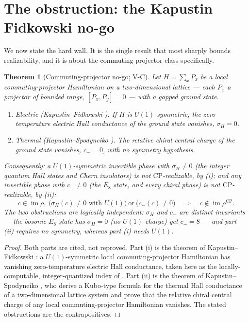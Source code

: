 \documentclass[12pt]{article}
\newcommand{\real}{\rho}                         %
\newcommand{\CP}{\mathrm{CP}}                    %
\newcommand{\im}{\operatorname{im}}
\newtheorem{theorem}{Theorem}[section]
\theoremstyle{definition}
\theoremstyle{remark}
\begin{document}
\section{The obstruction: the Kapustin--Fidkowski no-go}
\label{sec:nogo}

We now state the hard wall. It is the single result that most sharply bounds realizability,
and it is about the commuting-projector class specifically.

\begin{theorem}[Commuting-projector no-go; V-C]
\label{thm:VC}
Let $H=\sum_x P_x$ be a local commuting-projector Hamiltonian on a two-dimensional lattice
--- each $P_x$ a projector of bounded range, $[P_x,P_y]=0$ --- with a gapped ground state.
\begin{enumerate}
  \item[(i)] \emph{Electric (Kapustin--Fidkowski \cite{kapustin-fidkowski}).} If $H$ is
        $U(1)$-symmetric, the zero-temperature electric Hall conductance of the ground state
        vanishes, $\sigma_H=0$.
  \item[(ii)] \emph{Thermal (Kapustin--Spodyneiko \cite{kapustin-spodyneiko-thermal}).} The
        relative chiral central charge of the ground state vanishes, $c_-=0$, with \emph{no}
        symmetry hypothesis.
\end{enumerate}
Consequently: a $U(1)$-symmetric invertible phase with $\sigma_H\ne0$ (the integer quantum
Hall states and Chern insulators) is not $\CP$-realizable, by (i); and \emph{any} invertible
phase with $c_-\ne0$ (the $E_8$ state, and every chiral phase) is not $\CP$-realizable, by
(ii):
\[
  c\in\im\real,\ \bigl(\text{$\sigma_H(c)\ne0$ with $U(1)$}\bigr)\ \text{or}\ \bigl(c_-(c)\ne0\bigr)
  \quad\Longrightarrow\quad c\notin\im\real^{\CP}.
\]
The two obstructions are logically independent: $\sigma_H$ and $c_-$ are distinct invariants
--- the bosonic $E_8$ state has $\sigma_H=0$ (no $U(1)$ charge) yet $c_-=8$ --- and part (ii)
requires no symmetry, whereas part (i) needs $U(1)$.
\end{theorem}

\begin{proof}
Both parts are cited, not reproved. Part (i) is the theorem of Kapustin--Fidkowski
\cite{kapustin-fidkowski}: a $U(1)$-symmetric local commuting-projector Hamiltonian has
vanishing zero-temperature electric Hall conductance, taken here as the locally-computable,
integer-quantized index of \cite{kapustin-sopenko-hall}. Part (ii) is the theorem of
Kapustin--Spodyneiko \cite{kapustin-spodyneiko-thermal}, who derive a Kubo-type formula for
the thermal Hall conductance of a two-dimensional lattice system and prove that the relative
chiral central charge of any local commuting-projector Hamiltonian vanishes. The stated
obstructions are the contrapositives.
\end{proof}
\end{document}
